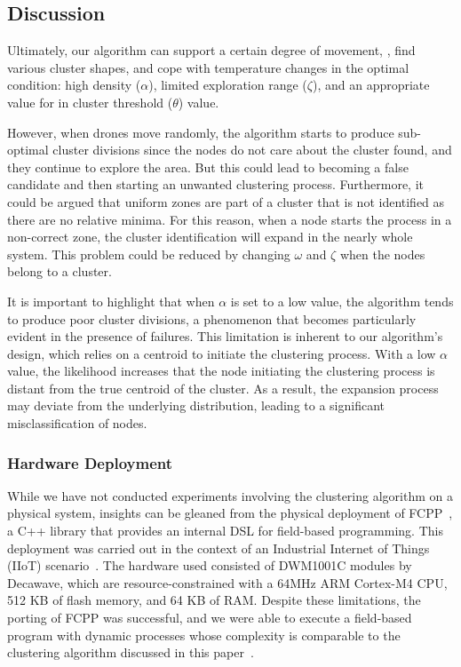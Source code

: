 \subsection{Discussion}
\label{sec:eval-discussion}

Ultimately, 
 our algorithm can support a certain degree of movement, ,
 find various cluster shapes, 
 and cope with temperature changes in the optimal condition:
 high density ($\alpha$), limited exploration range ($\zeta$), and an appropriate value for in cluster threshold ($\theta$) value.

However, when drones move randomly, 
 the algorithm starts to produce sub-optimal cluster divisions since the nodes do not care about the cluster found,
 and they continue to explore the area.
%
But this could lead to becoming a false candidate and then starting an unwanted clustering process.
 Furthermore, it could be argued that uniform zones are part of a cluster that is not identified as there are no relative minima.
%
For this reason, when a node starts the process in a non-correct zone, the cluster identification will expand in the nearly whole system.
 This problem could be reduced by changing $\omega$ and $\zeta$ when the nodes belong to a cluster.

It is important to highlight that when \(\alpha\) is set to a low value, 
 the algorithm tends to produce poor cluster divisions, a phenomenon that becomes particularly evident in the presence of failures. 
 This limitation is inherent to our algorithm's design, 
 which relies on a centroid to initiate the clustering process.
% 
With a low \(\alpha\) value, 
 the likelihood increases that the node initiating the clustering process is distant from the true centroid of the cluster. 
 As a result, the expansion process may deviate from the underlying distribution, leading to a significant misclassification of nodes.

\subsubsection*{Hardware Deployment}
\label{sec:eval-discussion-deployment}
While we have not conducted experiments involving the clustering algorithm on a physical system, 
 insights can be gleaned from the physical deployment of FCPP~\cite{DBLP:conf/acsos/Audrito20}, a C++ library that provides an internal DSL for field-based programming. 
 This deployment was carried out in the context of an Industrial Internet of Things (IIoT) scenario~\cite{testa:pmcj:2022}. 
 The hardware used consisted of DWM1001C modules by Decawave, which are resource-constrained with a 64MHz ARM Cortex-M4 CPU, 512 KB of flash memory, and 64 KB of RAM. 
 Despite these limitations, the porting of FCPP was successful, and we were able to execute a field-based program with dynamic processes whose complexity is comparable to the clustering algorithm discussed in this paper~\cite{testa:pmcj:2022}.

